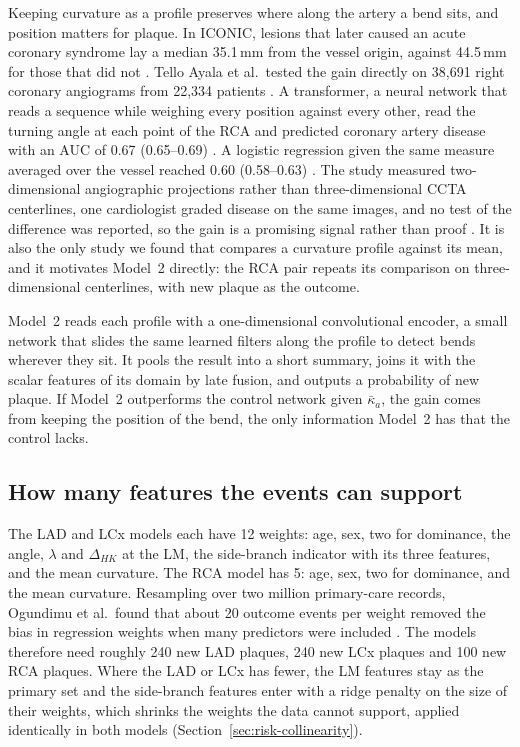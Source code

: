 Keeping curvature as a profile preserves where along the artery a bend sits, and position matters for plaque.
In ICONIC, lesions that later caused an acute coronary syndrome lay a median 35.1\,mm from the vessel origin, against 44.5\,mm for those that did not \cite{han2022plaque}.
Tello Ayala et al.\ tested the gain directly on 38{,}691 right coronary angiograms from 22{,}334 patients \cite{telloayala2026tortuosity}.
A transformer, a neural network that reads a sequence while weighing every position against every other, read the turning angle at each point of the RCA and predicted coronary artery disease with an AUC of 0.67 (0.65--0.69) \cite{telloayala2026tortuosity}.
A logistic regression given the same measure averaged over the vessel reached 0.60 (0.58--0.63) \cite{telloayala2026tortuosity}.
The study measured two-dimensional angiographic projections rather than three-dimensional CCTA centerlines, one cardiologist graded disease on the same images, and no test of the difference was reported, so the gain is a promising signal rather than proof \cite{telloayala2026tortuosity}.
It is also the only study we found that compares a curvature profile against its mean, and it motivates Model~2 directly: the RCA pair repeats its comparison on three-dimensional centerlines, with new plaque as the outcome.

Model~2 reads each profile with a one-dimensional convolutional encoder, a small network that slides the same learned filters along the profile to detect bends wherever they sit.
It pools the result into a short summary, joins it with the scalar features of its domain by late fusion, and outputs a probability of new plaque.
If Model~2 outperforms the control network given $\bar\kappa_a$, the gain comes from keeping the position of the bend, the only information Model~2 has that the control lacks.

\subsection{How many features the events can support}

The LAD and LCx models each have 12 weights: age, sex, two for dominance, the angle, $\lambda$ and $\Delta_{HK}$ at the LM, the side-branch indicator with its three features, and the mean curvature.
The RCA model has 5: age, sex, two for dominance, and the mean curvature.
Resampling over two million primary-care records, Ogundimu et al.\ found that about 20 outcome events per weight removed the bias in regression weights when many predictors were included \cite{ogundimu2016epv}.
The models therefore need roughly 240 new LAD plaques, 240 new LCx plaques and 100 new RCA plaques.
Where the LAD or LCx has fewer, the LM features stay as the primary set and the side-branch features enter with a ridge penalty on the size of their weights, which shrinks the weights the data cannot support, applied identically in both models (Section~\ref{sec:risk-collinearity}).

